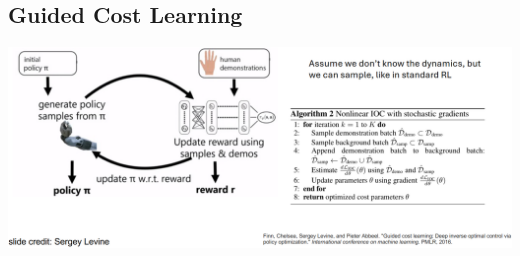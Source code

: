 \documentclass[10pt]{article}
\begin{document}
\subsection*{Guided Cost Learning}
\begin{center}
    \includegraphics*[width=\textwidth]{L2_29.png}
\end{center}
\end{document}
